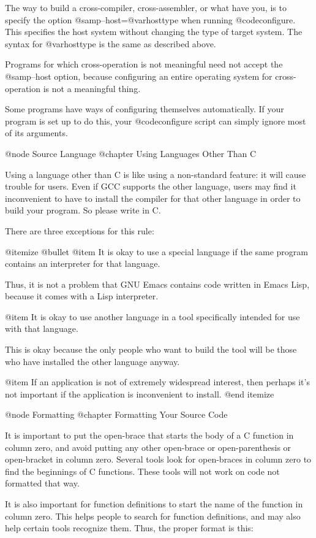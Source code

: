The way to build a cross-compiler, cross-assembler, or what have you, is
to specify the option @samp{--host=@var{hosttype}} when running
@code{configure}.  This specifies the host system without changing the
type of target system.  The syntax for @var{hosttype} is the same as
described above.

Programs for which cross-operation is not meaningful need not accept the
@samp{--host} option, because configuring an entire operating system for
cross-operation is not a meaningful thing.

Some programs have ways of configuring themselves automatically.  If
your program is set up to do this, your @code{configure} script can simply
ignore most of its arguments.


@node Source Language
@chapter Using Languages Other Than C

Using a language other than C is like using a non-standard feature: it
will cause trouble for users.  Even if GCC supports the other language,
users may find it inconvenient to have to install the compiler for that
other language in order to build your program.  So please write in C.

There are three exceptions for this rule:

@itemize @bullet
@item
It is okay to use a special language if the same program contains an
interpreter for that language.

Thus, it is not a problem that GNU Emacs contains code written in Emacs
Lisp, because it comes with a Lisp interpreter.

@item
It is okay to use another language in a tool specifically intended for
use with that language.

This is okay because the only people who want to build the tool will be
those who have installed the other language anyway.

@item
If an application is not of extremely widespread interest, then perhaps
it's not important if the application is inconvenient to install.
@end itemize

@node Formatting
@chapter Formatting Your Source Code

It is important to put the open-brace that starts the body of a C
function in column zero, and avoid putting any other open-brace or
open-parenthesis or open-bracket in column zero.  Several tools look
for open-braces in column zero to find the beginnings of C functions.
These tools will not work on code not formatted that way.

It is also important for function definitions to start the name of the
function in column zero.  This helps people to search for function
definitions, and may also help certain tools recognize them.  Thus,
the proper format is this:

